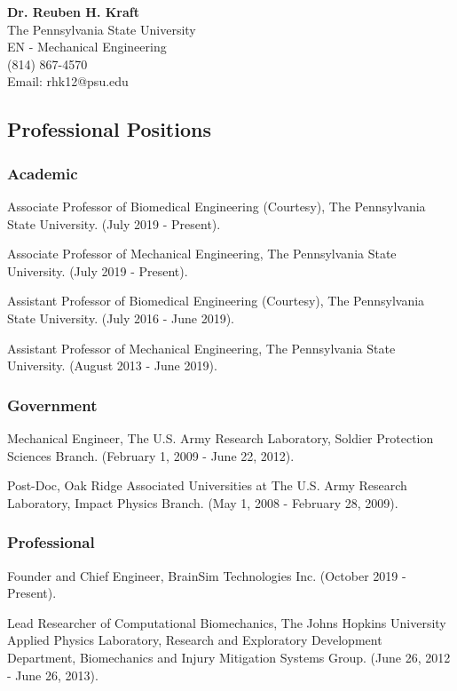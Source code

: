 \documentclass[
]{article}
\author{}
\date{}
\begin{document}
\textbf{Dr. Reuben H. Kraft}\\
The Pennsylvania State University\\
EN - Mechanical Engineering\\
(814) 867-4570\\
Email: rhk12@psu.edu

\subsection{Professional Positions}\label{professional-positions}

\subsubsection{Academic}\label{academic}

Associate Professor of Biomedical Engineering (Courtesy), The
Pennsylvania State University. (July 2019 - Present).

Associate Professor of Mechanical Engineering, The Pennsylvania State
University. (July 2019 - Present).

Assistant Professor of Biomedical Engineering (Courtesy), The
Pennsylvania State University. (July 2016 - June 2019).

Assistant Professor of Mechanical Engineering, The Pennsylvania State
University. (August 2013 - June 2019).

\subsubsection{Government}\label{government}

Mechanical Engineer, The U.S. Army Research Laboratory, Soldier
Protection Sciences Branch. (February 1, 2009 - June 22, 2012).

Post-Doc, Oak Ridge Associated Universities at The U.S. Army Research
Laboratory, Impact Physics Branch. (May 1, 2008 - February 28, 2009).

\subsubsection{Professional}\label{professional}

Founder and Chief Engineer, BrainSim Technologies Inc. (October 2019 -
Present).

Lead Researcher of Computational Biomechanics, The Johns Hopkins
University Applied Physics Laboratory, Research and Exploratory
Development Department, Biomechanics and Injury Mitigation Systems
Group. (June 26, 2012 - June 26, 2013).
\end{document}
